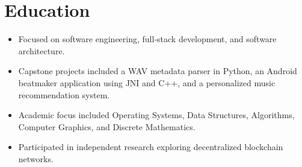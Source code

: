 %

\section{Education}


\begin{itemize}
\item Focused on software engineering, full-stack development, and software architecture.
\item Capstone projects included a WAV metadata parser in Python, an Android beatmaker application using JNI and C++, and a personalized music recommendation system.
\end{itemize}

\vspace{0.5em}


\begin{itemize}
\item Academic focus included Operating Systems, Data Structures, Algorithms, Computer Graphics, and Discrete Mathematics.
\item Participated in independent research exploring decentralized blockchain networks.
\end{itemize}
